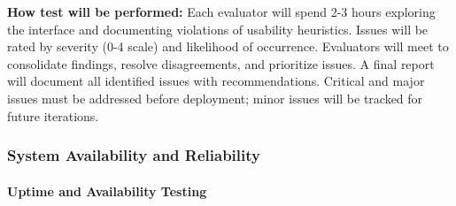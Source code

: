 \documentclass[12pt, titlepage]{article}
\begin{document}
\begin{enumerate}
\textbf{How test will be performed:} Each evaluator will spend 2-3 hours exploring the interface and documenting violations of usability heuristics. Issues will be rated by severity (0-4 scale) and likelihood of occurrence. Evaluators will meet to consolidate findings, resolve disagreements, and prioritize issues. A final report will document all identified issues with recommendations. Critical and major issues must be addressed before deployment; minor issues will be tracked for future iterations.

\end{enumerate}

\subsubsection{System Availability and Reliability}

\paragraph{Uptime and Availability Testing}
\end{document}

